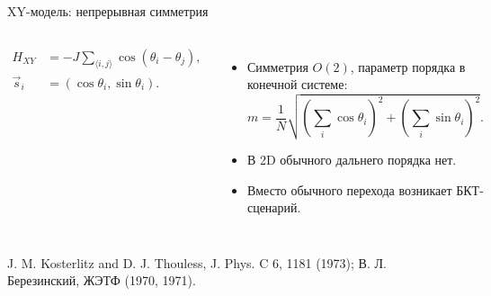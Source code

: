 \documentclass[t,aspectratio=169]{beamer}
\newcommand{\source}[1]{\vfill{\tiny\raggedright #1\par}}
\begin{document}
\begin{frame}{XY-модель: непрерывная симметрия}
  \begin{columns}[T,onlytextwidth]
    \small
    \[
      \begin{aligned}
        H_{XY}&=-J\sum_{\langle i,j\rangle}\cos(\theta_i-\theta_j),\\
        \vec s_i&=(\cos\theta_i,\sin\theta_i).
      \end{aligned}
    \]
    \begin{itemize}
      \item Симметрия \(O(2)\), параметр порядка в конечной системе:
      \[
        m=\frac{1}{N}\sqrt{\left(\sum_i\cos\theta_i\right)^2+
        \left(\sum_i\sin\theta_i\right)^2}.
      \]
      \item В 2D обычного дальнего порядка нет.
      \item Вместо обычного перехода возникает БКТ-сценарий.
    \end{itemize}
    \centering
  \end{columns}
  \source{J. M. Kosterlitz and D. J. Thouless, J. Phys. C 6, 1181 (1973); В. Л. Березинский, ЖЭТФ (1970, 1971).}
\end{frame}
\end{document}
